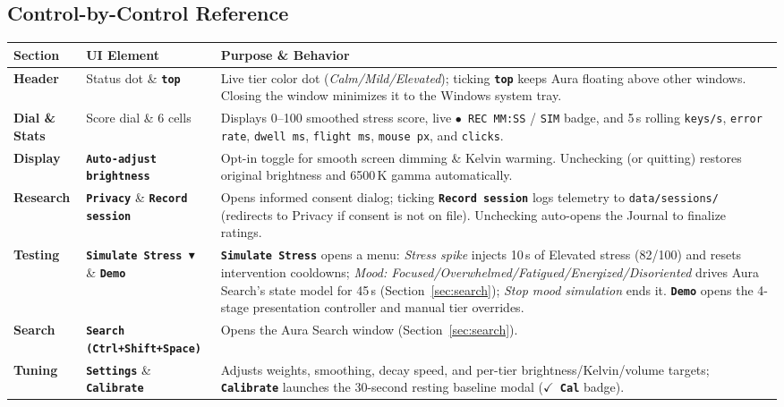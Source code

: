 \documentclass[11pt,a4paper]{article}
\newcommand{\uictrl}[1]{\texttt{\textbf{#1}}}
\begin{document}
\subsection{Control-by-Control Reference}
\begin{table}[htbp]
\centering
\scriptsize
\begin{tabularx}{\textwidth}{>{\raggedright\arraybackslash}p{2.1cm} >{\raggedright\arraybackslash}p{3.6cm} >{\raggedright\arraybackslash}X}
\toprule
\textbf{Section} & \textbf{UI Element} & \textbf{Purpose \& Behavior} \\
\midrule
\textbf{Header} & Status dot \& \uictrl{top} & Live tier color dot (\textit{Calm/Mild/Elevated}); ticking \uictrl{top} keeps Aura floating above other windows. Closing the window minimizes it to the Windows system tray. \\
\textbf{Dial \& Stats} & Score dial \& 6 cells & Displays 0--100 smoothed stress score, live \texttt{$\bullet$ REC MM:SS} / \texttt{SIM} badge, and 5\,s rolling \texttt{keys/s}, \texttt{error rate}, \texttt{dwell ms}, \texttt{flight ms}, \texttt{mouse px}, and \texttt{clicks}. \\
\textbf{Display} & \uictrl{Auto-adjust brightness} & Opt-in toggle for smooth screen dimming \& Kelvin warming. Unchecking (or quitting) restores original brightness and 6500\,K gamma automatically. \\
\textbf{Research} & \uictrl{Privacy} \& \uictrl{Record session} & Opens informed consent dialog; ticking \uictrl{Record session} logs telemetry to \texttt{data/sessions/} (redirects to Privacy if consent is not on file). Unchecking auto-opens the Journal to finalize ratings. \\
\textbf{Testing} & \uictrl{Simulate Stress $\blacktriangledown$} \& \uictrl{Demo} & \uictrl{Simulate Stress} opens a menu: \textit{Stress spike} injects 10\,s of Elevated stress (82/100) and resets intervention cooldowns; \textit{Mood: Focused/Overwhelmed/Fatigued/Energized/Disoriented} drives Aura Search's state model for 45\,s (Section~\ref{sec:search}); \textit{Stop mood simulation} ends it. \uictrl{Demo} opens the 4-stage presentation controller and manual tier overrides. \\
\textbf{Search} & \uictrl{Search (Ctrl+Shift+Space)} & Opens the Aura Search window (Section~\ref{sec:search}). \\
\textbf{Tuning} & \uictrl{Settings} \& \uictrl{Calibrate} & Adjusts weights, smoothing, decay speed, and per-tier brightness/Kelvin/volume targets; \uictrl{Calibrate} launches the 30-second resting baseline modal (\uictrl{$\checkmark$ Cal} badge). \\

\end{tabularx}
\end{table}
\end{document}
